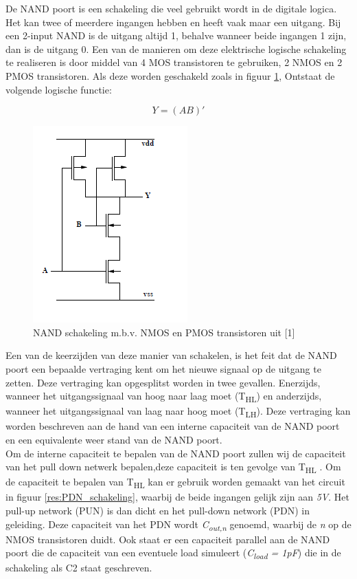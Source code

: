 \documentclass{article}
\begin{document}
\newcommand{\tss}{\textsubscript}

De NAND poort is een schakeling die veel gebruikt wordt in de digitale logica. Het kan twee of meerdere ingangen hebben en heeft vaak maar een uitgang. Bij een 2-input NAND is de uitgang altijd 1, behalve wanneer beide ingangen 1 zijn, dan is de uitgang 0. Een van de manieren om deze elektrische logische schakeling te realiseren is door middel van 4 MOS transistoren te gebruiken, 2 NMOS en 2 PMOS transistoren. Als deze worden geschakeld zoals in figuur \ref{res:NAND_schakeling}, Ontstaat de volgende logische functie: 

\begin{equation}
Y = (AB)'
\end{equation}

 \begin{figure} [h!]
 \begin{center}
 \includegraphics [scale = 1] {../figures/NAND}
 \caption{NAND schakeling m.b.v. NMOS en PMOS transistoren uit [1]}
 \label{res:NAND_schakeling}
 \end{center}
 \end{figure}

Een van de keerzijden van deze manier van schakelen, is het feit dat de NAND poort een bepaalde vertraging kent om het nieuwe signaal op de uitgang te zetten. Deze vertraging kan opgesplitst worden in twee gevallen. Enerzijds, wanneer het uitgangssignaal van hoog naar laag moet (T\tss{HL}) en anderzijds, wanneer het uitgangssignaal van laag naar hoog moet (T\tss{LH}). Deze vertraging kan worden beschreven aan de hand van een interne capaciteit van de NAND poort en een equivalente weer stand van de NAND poort.\\

Om de interne capaciteit te bepalen van de NAND poort zullen wij de capaciteit van het pull down netwerk bepalen,deze capaciteit is ten gevolge van T\tss{HL} . Om de capaciteit te bepalen van T\tss{HL} kan er gebruik worden gemaakt van het  circuit in figuur \ref{res:PDN_schakeling}, waarbij de beide ingangen gelijk zijn aan \emph{5V}. Het pull-up network (PUN) is dan dicht en het pull-down network (PDN) in geleiding. Deze capaciteit van het PDN wordt \emph{C\tss{out,n}} genoemd, waarbij de \emph{n} op de NMOS transistoren duidt. Ook staat er een capaciteit parallel aan de NAND poort die de capaciteit van een eventuele load simuleert (\emph{C\tss{load} = 1pF}) die in de schakeling als C2 staat geschreven.
\end{document}
